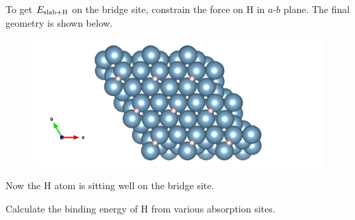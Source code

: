 \documentclass[12pt]{article}
\begin{document}
\begin{figure}[h]
\begin{center}
	\quad
\end{center}
\end{figure}

To get $E_{\rm slab+H}$ on the bridge site, constrain the force on H in $a$-$b$ plane. The final geometry is shown below. 
\clearpage

\begin{figure}[h]
\begin{center}
	\includegraphics[trim=6.5cm 0 6.5cm 0,clip,width=.4\textwidth]{bridge_c.png}
\end{center}
\end{figure}

Now the H atom is sitting well on the bridge site. 

Calculate the binding energy of H from various absorption sites. 
\end{document}
